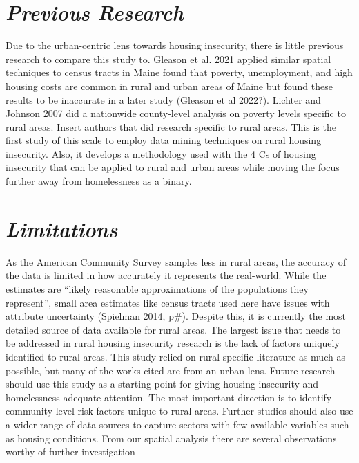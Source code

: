 \section{\textit{Previous Research}}

Due to the urban-centric lens towards housing insecurity, there is little previous research to compare this study to. Gleason et al. 2021 applied similar spatial techniques to census tracts in Maine found that poverty, unemployment, and high housing costs are common in rural and urban areas of Maine but found these results to be inaccurate in a later study (Gleason et al 2022?). Lichter and Johnson 2007 did a nationwide county-level analysis on poverty levels specific to rural areas. Insert authors that did research specific to rural areas. This is the first study of this scale to employ data mining techniques on rural housing insecurity. Also, it develops a methodology used with the 4 Cs of housing insecurity that can be applied to rural and urban areas while moving the focus further away from homelessness as a binary. 


\section{\textit{Limitations}}
As the American Community Survey samples less in rural areas, the accuracy of the data is limited in how accurately it represents the real-world. While the estimates are “likely reasonable approximations of the populations they represent”, small area estimates like census tracts used here have issues with attribute uncertainty (Spielman 2014, p#). Despite this, it is currently the most detailed source of data available for rural areas. The largest issue that needs to be addressed in rural housing insecurity research is the lack of factors uniquely identified to rural areas. This study relied on rural-specific literature as much as possible, but many of the works cited are from an urban lens. Future research should use this study as a starting point for giving housing insecurity and homelessness adequate attention. The most important direction is to identify community level risk factors unique to rural areas. Further studies should also use a wider range of data sources to capture sectors with few available variables such as housing conditions. From our spatial analysis there are several observations worthy of further investigation  